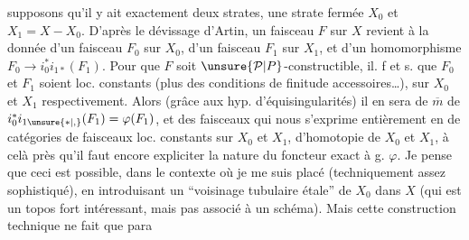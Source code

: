 supposons qu'il y ait exactement deux strates, une strate fermée $X_0$ et $X_1=X-X_0$. D'après le dévissage d'Artin, un faisceau $F$ sur $X$ revient à la donnée d'un faisceau $F_0$  sur $X_0$, d'un faisceau $F_1$  sur $X_1$, et d'un homomorphisme $F_0\longrightarrow i_0^*i_{1*}(F_1)$. Pour que $F$
\reversemarginpar{}\normalmarginpar%
soit $\unsure{\mathcal P|P}$-constructible, il. f et s. que $F_0$ et $F_1$ soient loc. constants (plus des conditions de finitude accessoires\ldots), sur $X_0$ et $X_1$ respectivement. Alors (grâce aux hyp. d'équisingularités) il en sera de $\overline m$ de $i_0^*i_{1\unsure{*|,}}(F_1)=\varphi(F_1)$, et  des faisceaux qui nous  s'exprime entièrement en   de catégories de faisceaux loc. constants sur $X_0$ et $X_1$,   d'homotopie de $X_0$ et $X_1$, à celà près qu'il faut encore expliciter la nature du foncteur exact à g. $\varphi$. Je pense que ceci est possible, dans le contexte  où je me suis placé (techniquement assez sophistiqué), en introduisant un ``voisinage tubulaire étale'' de $X_0$ dans $X$ (qui est un topos fort intéressant, mais pas associé à un schéma). Mais cette construction technique ne fait que para%
